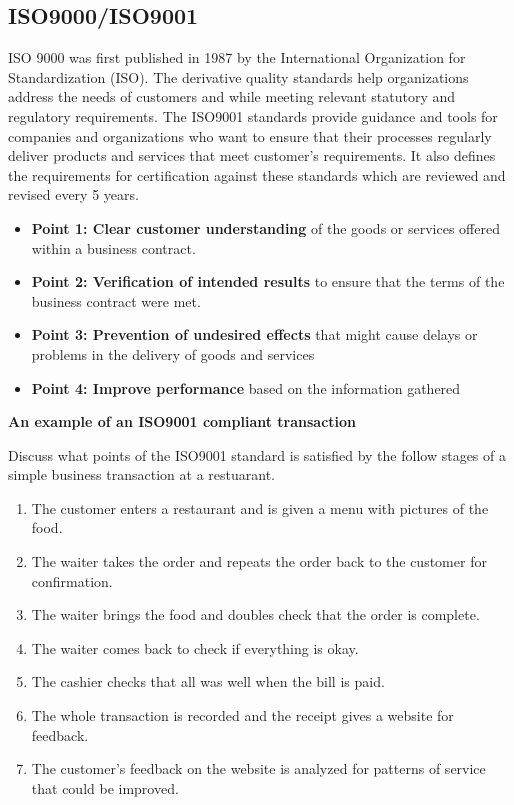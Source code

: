 \documentclass[]{book}
\providecommand{\tightlist}{%
  \setlength{\itemsep}{0pt}\setlength{\parskip}{0pt}}
\let\BeginKnitrBlock\begin \let\EndKnitrBlock\end
\begin{document}
\hypertarget{iso9000iso9001}{%
\subsection{ISO9000/ISO9001}\label{iso9000iso9001}}

ISO 9000 was first published in 1987 by the International Organization for Standardization (ISO). The derivative quality standards help organizations address the needs of customers and while meeting relevant statutory and regulatory requirements.\citep{ISOweb} The ISO9001 standards provide guidance and tools for companies and organizations who want to ensure that their processes regularly deliver products and services that meet customer's requirements. It also defines the requirements for certification against these standards which are reviewed and revised every 5 years.\citep{ISO2015}

\begin{itemize}
\tightlist
\item
  \textbf{Point 1: Clear customer understanding} of the goods or services offered within a business contract.
\item
  \textbf{Point 2: Verification of intended results} to ensure that the terms of the business contract were met.
\item
  \textbf{Point 3: Prevention of undesired effects} that might cause delays or problems in the delivery of goods and services
\item
  \textbf{Point 4: Improve performance} based on the information gathered
\end{itemize}

\BeginKnitrBlock{rmddiscussion}
\textbf{An example of an ISO9001 compliant transaction}

Discuss what points of the ISO9001 standard is satisfied by the follow stages of a simple business transaction at a restuarant.

\begin{enumerate}
\def\labelenumi{\arabic{enumi}.}
\tightlist
\item
  The customer enters a restaurant and is given a menu with pictures of the food.
\item
  The waiter takes the order and repeats the order back to the customer for confirmation.
\item
  The waiter brings the food and doubles check that the order is complete.
\item
  The waiter comes back to check if everything is okay.
\item
  The cashier checks that all was well when the bill is paid.
\item
  The whole transaction is recorded and the receipt gives a website for feedback.
\item
  The customer's feedback on the website is analyzed for patterns of service that could be improved.
\end{enumerate}
\EndKnitrBlock{rmddiscussion}
\end{document}
